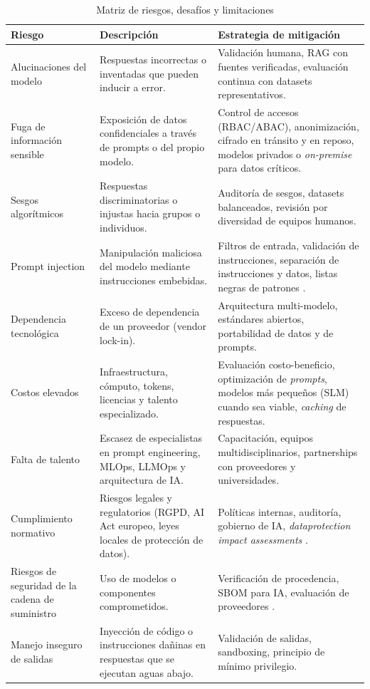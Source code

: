 \documentclass[12pt,a4paper,oneside]{article}
\begin{document}
\begin{table}[h!]
\centering
\caption{Matriz de riesgos, desafíos y limitaciones}
\label{tab:riesgos}
\begin{tabular}{p{3.5cm} p{4.5cm} p{6.5cm}}
\toprule
\textbf{Riesgo} & \textbf{Descripción} & \textbf{Estrategia de mitigación} \\
\midrule
Alucinaciones del modelo & Respuestas incorrectas o inventadas que pueden inducir a error. & Validación humana, RAG con fuentes verificadas, evaluación continua con datasets representativos. \\
Fuga de información sensible & Exposición de datos confidenciales a través de prompts o del propio modelo. & Control de accesos (RBAC/ABAC), anonimización, cifrado en tránsito y en reposo, modelos privados o \textit{on-premise} para datos críticos. \\
Sesgos algorítmicos & Respuestas discriminatorias o injustas hacia grupos o individuos. & Auditoría de sesgos, datasets balanceados, revisión por diversidad de equipos humanos. \\
Prompt injection & Manipulación maliciosa del modelo mediante instrucciones embebidas. & Filtros de entrada, validación de instrucciones, separación de instrucciones y datos, listas negras de patrones \cite{owaspTop10LLM2025}. \\
Dependencia tecnológica & Exceso de dependencia de un proveedor (vendor lock-in). & Arquitectura multi-modelo, estándares abiertos, portabilidad de datos y de prompts. \\
Costos elevados & Infraestructura, cómputo, tokens, licencias y talento especializado. & Evaluación costo-beneficio, optimización de \textit{prompts}, modelos más pequeños (SLM) cuando sea viable, \textit{caching} de respuestas. \\
Falta de talento & Escasez de especialistas en prompt engineering, MLOps, LLMOps y arquitectura de IA. & Capacitación, equipos multidisciplinarios, partnerships con proveedores y universidades. \\
Cumplimiento normativo & Riesgos legales y regulatorios (RGPD, AI Act europeo, leyes locales de protección de datos). & Políticas internas, auditoría, gobierno de IA, \textit{dataprotection impact assessments} \cite{nistGenAI2024}. \\
Riesgos de seguridad de la cadena de suministro & Uso de modelos o componentes comprometidos. & Verificación de procedencia, SBOM para IA, evaluación de proveedores \cite{owaspTop10LLM2025}. \\
Manejo inseguro de salidas & Inyección de código o instrucciones dañinas en respuestas que se ejecutan aguas abajo. & Validación de salidas, sandboxing, principio de mínimo privilegio. \\
\bottomrule
\end{tabular}
\end{table}
\end{document}
